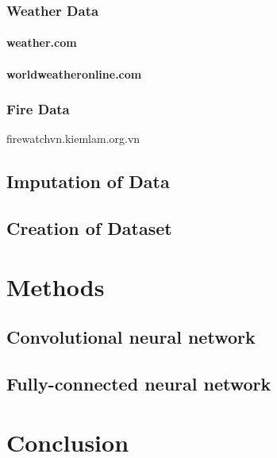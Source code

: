 \documentclass{article}
\begin{document}
\subsubsection{Weather Data}
\paragraph{weather.com}

\paragraph{worldweatheronline.com}

\subsubsection{Fire Data}
firewatchvn.kiemlam.org.vn

\subsection{Imputation of Data}
\subsection{Creation of Dataset}





\section{Methods}

\subsection{Convolutional neural network}
\subsection{Fully-connected neural network}



\section{Conclusion}






\end{document}
